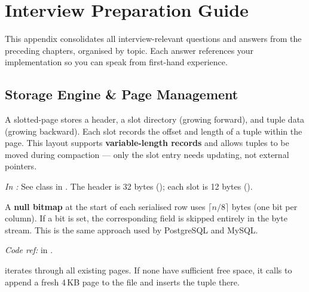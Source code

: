 \chapter{Interview Preparation Guide}
\label{ch:interview-prep}

This appendix consolidates all interview-relevant questions and answers from the preceding chapters, organised by topic.  Each answer references your \shiftdb{} implementation so you can speak from first-hand experience.

\section{Storage Engine \& Page Management}

\begin{interviewbox}
A slotted-page stores a header, a slot directory (growing forward), and tuple data (growing backward).  Each slot records the offset and length of a tuple within the page.  This layout supports \textbf{variable-length records} and allows tuples to be moved during compaction --- only the slot entry needs updating, not external pointers.

\emph{In \shiftdb{}:} See  class in .  The header is 32 bytes (); each slot is 12 bytes ().
\end{interviewbox}

\begin{interviewbox}
A \textbf{null bitmap} at the start of each serialised row uses $\lceil n/8 \rceil$ bytes (one bit per column).  If a bit is set, the corresponding field is skipped entirely in the byte stream.  This is the same approach used by PostgreSQL and MySQL.

\emph{Code ref:}  in .
\end{interviewbox}

\begin{interviewbox}
 iterates through all existing pages.  If none have sufficient free space, it calls  to append a fresh 4\,KB page to the  file and inserts the tuple there.
\end{interviewbox}

